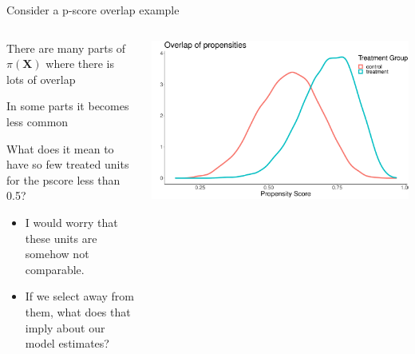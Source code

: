 \documentclass[notes,11pt, aspectratio=169]{beamer}
\newenvironment{wideitemize}{\itemize\addtolength{\itemsep}{10pt}}{\enditemize}
\begin{document}
\begin{frame}{Consider a p-score overlap example}
\begin{columns}[T] %
\begin{column}{.5\textwidth}
  \begin{wideitemize}
  \item There are many parts of $\pi(\mathbf{X})$ where there is lots of overlap
  \item In some parts it becomes less common
  \item What does it mean to have so few treated units for the pscore less than 0.5?
    \begin{itemize}
    \item I would worry that these units are somehow not comparable.
    \item If we select away from them, what does that imply about our model estimates?
    \end{itemize}
    \end{wideitemize}
\end{column}%
\hfill%
\begin{column}{.5\textwidth}
\includegraphics[width=\linewidth]{images/overlap1.pdf}
\end{column}%
\end{columns}
\end{frame}
\end{document}
